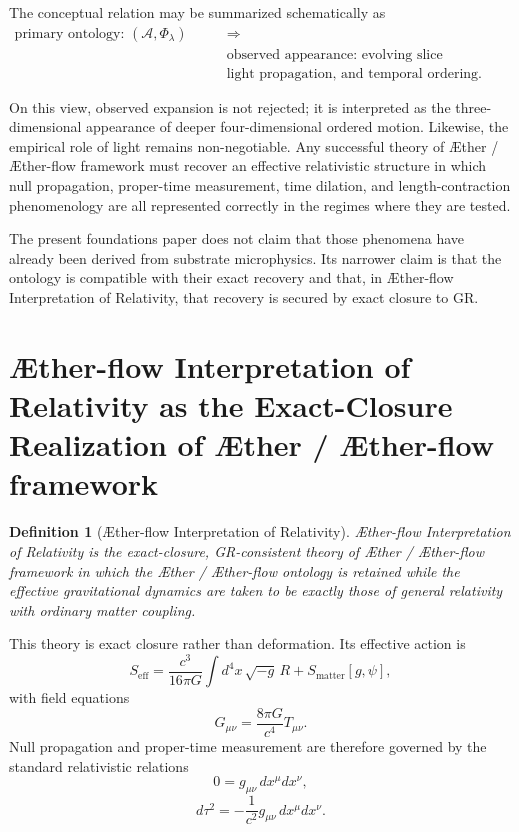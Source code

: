 \documentclass[11pt]{article}
\newcommand{\Aether}{\AE{}ther}
\newcommand{\Aflow}{\AE{}ther-flow}
\newcommand{\TheoryName}{\Aflow{} Interpretation of Relativity}
\newcommand{\TheoryProgram}{\Aether{} / \Aflow{} framework}
\newcommand{\Sub}{\mathcal{A}}
\newtheorem{definition}{Definition}
\begin{document}
The conceptual relation may be summarized schematically as
\[
\begin{aligned}
\text{primary ontology: } (\Sub,\Phi_{\lambda})
\qquad &\Longrightarrow \\
&\text{observed appearance: evolving slice geometry,} \\
&\text{light propagation, and temporal ordering}.
\end{aligned}
\]

On this view, observed expansion is not rejected; it is interpreted as the three-dimensional appearance of deeper four-dimensional ordered motion. Likewise, the empirical role of light remains non-negotiable. Any successful theory of \TheoryProgram{} must recover an effective relativistic structure in which null propagation, proper-time measurement, time dilation, and length-contraction phenomenology are all represented correctly in the regimes where they are tested.

The present foundations paper does not claim that those phenomena have already been derived from substrate microphysics. Its narrower claim is that the ontology is compatible with their exact recovery and that, in \TheoryName{}, that recovery is secured by exact closure to GR.

\section{\TheoryName{} as the Exact-Closure Realization of \TheoryProgram{}}

\begin{definition}[\TheoryName{}]
\TheoryName{} is the exact-closure, GR-consistent theory of \TheoryProgram{} in which the \Aether{} / \Aflow{} ontology is retained while the effective gravitational dynamics are taken to be exactly those of general relativity with ordinary matter coupling.
\end{definition}

This theory is exact closure rather than deformation. Its effective action is
\begin{equation}
S_{\mathrm{eff}}
=
\frac{c^3}{16\pi G}\int d^4x\,\sqrt{-g}\,R
+
S_{\mathrm{matter}}[g,\psi],
\label{eq:SA}
\end{equation}
with field equations
\begin{equation}
G_{\mu\nu} = \frac{8\pi G}{c^4} T_{\mu\nu}.
\label{eq:einstein}
\end{equation}
Null propagation and proper-time measurement are therefore governed by the standard relativistic relations
\begin{equation}
0 = g_{\mu\nu}\,dx^{\mu}dx^{\nu},
\label{eq:null}
\end{equation}
\begin{equation}
d\tau^2 = -\frac{1}{c^2} g_{\mu\nu}\,dx^{\mu}dx^{\nu}.
\label{eq:propertime}
\end{equation}
\end{document}
